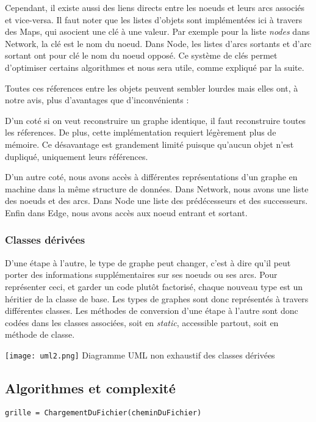 \documentclass[letterpaper,12pt]{article}
\begin{document}
Cependant, il existe aussi des liens directs entre les noeuds et leurs arcs associés et vice-versa. Il faut noter que les listes d'objets sont implémentées ici à travers des Maps, qui asocient une clé à une valeur. Par exemple pour la liste \textit{nodes} dans Network, la clé est le nom du noeud. Dans Node, les listes d'arcs sortants et d'arc sortant ont pour clé le nom du noeud opposé. Ce système de clés permet d'optimiser certains algorithmes et nous sera utile, comme expliqué par la suite.


Toutes ces réferences entre les objets peuvent sembler lourdes mais elles ont, à notre avis, plus d'avantages que d'inconvénients : 

D'un coté si on veut reconstruire un graphe identique, il faut reconstruire toutes les réferences. De plus, cette implémentation requiert légèrement plus de mémoire. Ce désavantage est grandement limité puisque qu'aucun objet n'est dupliqué, uniquement leurs références. 

D'un autre coté, nous avons accès à différentes représentations d'un graphe en machine dans la même structure de données. Dans Network, nous avons une liste des noeuds et des arcs. Dans Node une liste des prédécesseurs et des successeurs. Enfin dans Edge, nous avons accès aux noeud entrant et sortant.

\subsubsection{Classes dérivées}
D'une étape à l'autre, le type de graphe peut changer, c'est à dire qu'il peut porter des informations supplémentaires sur ses noeuds ou ses arcs. Pour représenter ceci, et garder un code plutôt factorisé, chaque nouveau type est un héritier de la classe de base. Les types de graphes sont donc représentés à travers différentes classes. Les méthodes de conversion d'une étape à l'autre sont donc codées dans les classes associées, soit en \textit{static}, accessible partout, soit en méthode de classe.

\begin{center}
    \texttt{[image: uml2.png]}
    Diagramme UML non exhaustif des classes dérivées
\end{center}

\subsection{Algorithmes et complexité} 
\begin{lstlisting}
grille = ChargementDuFichier(cheminDuFichier)

\end{lstlisting}
\end{document}
